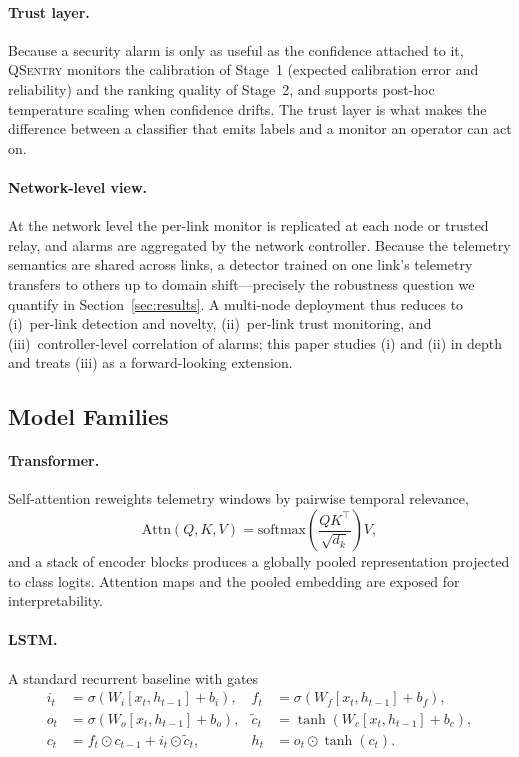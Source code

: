 \documentclass[runningheads]{llncs}
\begin{document}
\paragraph{Trust layer.}
Because a security alarm is only as useful as the confidence attached to it, \textsc{QSentry} monitors the calibration of Stage~1 (expected calibration error and reliability) and the ranking quality of Stage~2, and supports post-hoc temperature scaling when confidence drifts. The trust layer is what makes the difference between a classifier that emits labels and a monitor an operator can act on.

\paragraph{Network-level view.}
At the network level the per-link monitor is replicated at each node or trusted relay, and alarms are aggregated by the network controller. Because the telemetry semantics are shared across links, a detector trained on one link's telemetry transfers to others up to domain shift---precisely the robustness question we quantify in Section~\ref{sec:results}. A multi-node deployment thus reduces to (i)~per-link detection and novelty, (ii)~per-link trust monitoring, and (iii)~controller-level correlation of alarms; this paper studies (i) and (ii) in depth and treats (iii) as a forward-looking extension.

\subsection{Model Families}
\paragraph{Transformer.}
Self-attention reweights telemetry windows by pairwise temporal relevance,
\begin{equation}
\mathrm{Attn}(Q,K,V)=\mathrm{softmax}\!\left(\frac{QK^{\top}}{\sqrt{d_k}}\right)V,
\end{equation}
and a stack of encoder blocks produces a globally pooled representation projected to class logits. Attention maps and the pooled embedding are exposed for interpretability.

\paragraph{LSTM.}
A standard recurrent baseline with gates
\begin{align}
i_t &= \sigma(W_i[x_t,h_{t-1}]+b_i), &
f_t &= \sigma(W_f[x_t,h_{t-1}]+b_f), \nonumber\\
o_t &= \sigma(W_o[x_t,h_{t-1}]+b_o), &
\tilde{c}_t &= \tanh(W_c[x_t,h_{t-1}]+b_c), \\
c_t &= f_t\odot c_{t-1} + i_t\odot\tilde{c}_t, &
h_t &= o_t\odot\tanh(c_t). \nonumber
\end{align}
\end{document}
